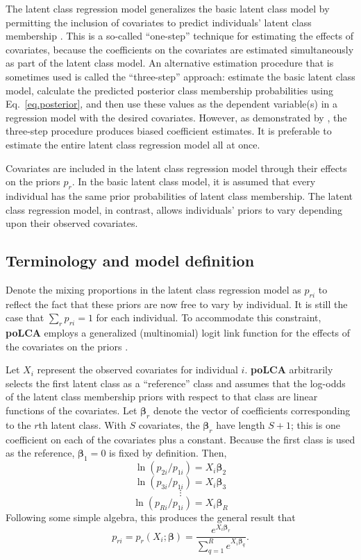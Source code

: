 \documentclass[letterpaper,12pt]{article}
\begin{document}
The latent class regression model generalizes the basic latent class model by permitting the inclusion of covariates to predict individuals' latent class membership \citep{DaytonMacready1988, HagenaarsMcCutcheon2002}.  This is a so-called ``one-step'' technique for estimating the effects of covariates, because the coefficients on the covariates are estimated simultaneously as part of the latent class model. An alternative estimation procedure that is sometimes used is called the ``three-step'' approach: estimate the basic latent class model, calculate the predicted posterior class membership probabilities using Eq.~\ref{eq.posterior}, and then use these values as the dependent variable(s) in a regression model with the desired covariates. However, as demonstrated by \citet{BCH2004}, the three-step procedure produces biased coefficient estimates.  It is preferable to estimate the entire latent class regression model all at once.

Covariates are included in the latent class regression model through their effects on the priors $p_r$.  In the basic latent class model, it is assumed that every individual has the same prior probabilities of latent class membership. The latent class regression model, in contrast, allows individuals' priors to vary depending upon their observed covariates.

\subsection{Terminology and model definition} \label{s.terminology_r}

Denote the mixing proportions in the latent class regression model as $p_{ri}$ to reflect the fact that these priors are now free to vary by individual. It is still the case that $\sum_r p_{ri}=1$ for each individual. To accommodate this constraint, \textbf{poLCA} employs a generalized (multinomial) logit link function for the effects of the covariates on the priors \citep{Agresti2002}.

Let $X_i$ represent the observed covariates for individual $i$. \textbf{poLCA} arbitrarily selects the first latent class as a ``reference'' class and assumes that the log-odds of the latent class membership priors with respect to that class are linear functions of the covariates. Let $\boldsymbol \beta_r$ denote the vector of coefficients corresponding to the $r$th latent class. With $S$ covariates, the $\boldsymbol \beta_r$ have length $S+1$; this is one coefficient on each of the covariates plus a constant. Because the first class is used as the reference, $\boldsymbol \beta_1=0$ is fixed by definition. Then,
$$ \ln ( p_{2i} / p_{1i} ) = X_i \boldsymbol \beta_2 $$
$$ \ln ( p_{3i} / p_{1i} ) = X_i \boldsymbol \beta_3 $$
$$ \vdots $$
$$ \ln ( p_{Ri} / p_{1i} ) = X_i \boldsymbol \beta_R $$
Following some simple algebra, this produces the general result that
\begin{equation}
p_{ri} = p_r(X_i;\boldsymbol \beta) = \frac{e^{X_i \boldsymbol
\beta_r}}{\sum_{q=1}^R e^{X_i \boldsymbol \beta_q}}.
\label{eq.mlogit}
\end{equation}
\end{document}
